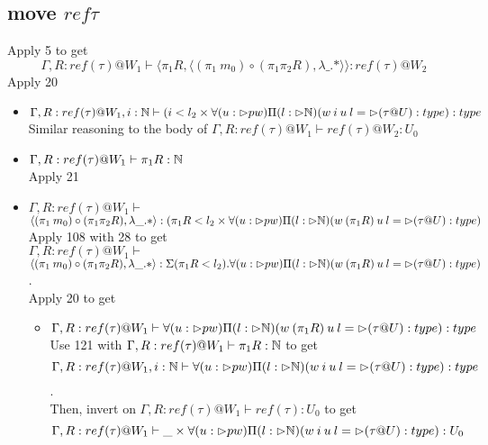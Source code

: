 \message{ !name(paper.tex)}\documentclass{article}
\begin{document}
  \subsection*{move $ref \tau$}
Apply 5 to get 
\[\Gamma, R: ref(\tau) @ W_1 \vdash \langle \pi_1 R, \langle (\pi_1\: m_0) \circ (\pi_1 \pi_2 R),
\lambda \_. * \rangle \rangle: ref(\tau) @ W_2
\]
Apply 20
\begin{itemize}
\item $\Gamma, R: ref(\tau) @ W_1, i : \mathbb{N} \vdash (i < l_2 \times
\forall(u: \rhd pw)\Pi(l: \rhd \mathbb{N})(w \: i \: u \: l = \rhd (\tau @ U) : type): type $\\
Similar reasoning to the body of $\Gamma,  R: ref(\tau)@W_1 \vdash ref(\tau) @ W_2: U_0$
    \item $\Gamma, R: ref(\tau) @ W_1 \vdash \pi_1 R : \mathbb{N}$\\
    Apply 21
    \item $\Gamma, R: ref(\tau) @ W_1 \vdash $\\
    $\langle (\pi_1\: m_0) \circ (\pi_1 \pi_2 R),
\lambda \_. * \rangle: (\pi_1 R < l_2 \times
\forall(u: \rhd pw)\Pi(l: \rhd \mathbb{N})(w \: (\pi_1 R) \: u \: l = \rhd (\tau @ U) : type
) $\\
Apply 108 with 28 to get\\
$\Gamma, R: ref(\tau) @ W_1 \vdash$\\
$\langle (\pi_1\: m_0) \circ (\pi_1 \pi_2 R),
\lambda \_. * \rangle: \Sigma(\pi_1 R < l_2).
\forall(u: \rhd pw)\Pi(l: \rhd \mathbb{N})(w \: (\pi_1 R) \: u \: l = \rhd (\tau @ U) : type
) $.\\
Apply 20 to get 
\begin{itemize}
    \item $\Gamma, R: ref(\tau) @ W_1 \vdash \forall(u: \rhd pw)\Pi(l: \rhd \mathbb{N})(w \: (\pi_1 R) \: u \: l = \rhd (\tau @ U) : type): type$\\
Use 121 with $\Gamma, R:  ref(\tau) @ W_1 \vdash \pi_1 R: \mathbb{N}$ to get
\[\Gamma, R: ref(\tau) @ W_1, i: \mathbb{N} \vdash \forall(u: \rhd pw)\Pi(l: \rhd \mathbb{N})(w \: i \: u \: l = \rhd (\tau @ U) : type): type\].\\
Then, invert on $\Gamma, R: ref(\tau) @ W_1 \vdash ref(\tau) : U_0$ to get
\[\Gamma, R: ref(\tau) @ W_1 \vdash \_ \times \forall(u: \rhd pw)\Pi(l: \rhd \mathbb{N})(w \: i \: u \: l = \rhd (\tau @ U) : type) : U_0\]


\end{itemize}
\end{itemize}
\end{document}

